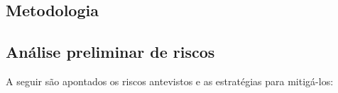 


\subsection{Metodologia}
\label{ssec:metod}


\subsection{Análise preliminar de riscos}
\label{ssec:risco}
A seguir são apontados os riscos antevistos e as estratégias para mitigá-los: 
